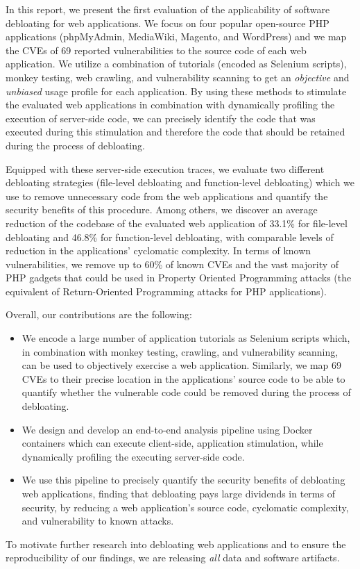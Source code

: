 In this report, we present the first evaluation of the applicability of software
debloating for web applications. We focus on four popular open-source PHP
applications (phpMyAdmin, MediaWiki, Magento, and WordPress) and we map the CVEs of 69
reported vulnerabilities to the source code of each web application. We utilize
a combination of tutorials (encoded as Selenium scripts), monkey testing,
web crawling, and vulnerability scanning to get an \emph{objective} and \emph{
unbiased} usage profile for each application. By using
these methods to stimulate the evaluated web applications in combination with
dynamically profiling the execution of server-side code, we can precisely
identify the code that was executed during this stimulation and therefore
the code that should be retained during the process of debloating.

Equipped with these server-side execution traces, we evaluate two different
debloating strategies (file-level debloating and function-level debloating)
which we use to remove unnecessary code from the web applications and quantify
the security benefits of this procedure. Among others, we discover an average
reduction of the codebase of the evaluated web application of 33.1\% for
file-level debloating and 46.8\% for function-level debloating, with comparable
levels of reduction in the applications' cyclomatic complexity.
In terms of
known vulnerabilities, we remove up to 60\% of known CVEs and the vast majority
of PHP gadgets that could be used in Property Oriented Programming attacks
(the equivalent of Return-Oriented Programming attacks for PHP applications).

\noindent Overall, our contributions are the following:

\begin{itemize}
  \setlength\itemsep{0.5em}
\item We encode a large number of application tutorials as Selenium scripts which, in combination with monkey testing, crawling, and vulnerability scanning, can be used to objectively exercise a web application. Similarly, we map 69 CVEs to their precise location in the applications' source code to be able to quantify whether the vulnerable code could be removed during the process of debloating.

\item We design and develop an end-to-end analysis pipeline using Docker containers which can execute client-side, application stimulation, while dynamically profiling the executing server-side code.

\item We use this pipeline to precisely quantify the security benefits of debloating web applications, finding that debloating pays large dividends in terms of security, by reducing a web application's source code, cyclomatic complexity, and vulnerability to known attacks.

\end{itemize}

\noindent To motivate further research into debloating web applications and to ensure the reproducibility of our findings, we are releasing \emph{all} data and software artifacts.
